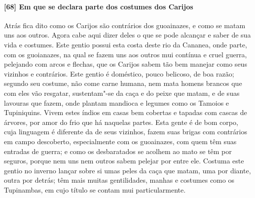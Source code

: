 \paragraph{[68] Em que se declara parte dos costumes dos Carijos} \quad
Atrás fica dito como os Carijos são contrários dos guoainazes, e como se matam uns aos
outros. Agora cabe aqui dizer deles o que se pode alcançar e saber de sua vida e costumes.
Este gentio possui esta costa deste rio da Cananea, onde parte, com os guoianazes, na qual
se fazem uns aos outros mui contínua e cruel guerra, pelejando com arcos e flechas, que os
Carijos sabem tão bem manejar como seus vizinhos e contrários. Este gentio é doméstico,
pouco belicoso, de boa razão; segundo seu costume, não come carne humana, nem mata homens
brancos que com eles vão resgatar, sustentam"-se da caça e do peixe que matam, e de suas
lavouras que fazem, onde plantam mandioca e legumes como os Tamoios e Tupiniquins. Vivem
estes índios em casas bem cobertas e tapadas com cascas de árvores, por amor do frio que
há naquelas partes. Esta gente é de bom corpo, cuja linguagem é diferente da de seus
vizinhos, fazem suas brigas com contrários em campo descoberto, especialmente com os
guoainazes, com quem têm suas entradas de guerra; e como os desbaratados se acolhem ao
mato se têm por seguros, porque nem uns nem outros sabem pelejar por entre ele. Costuma
este gentio no inverno lançar sobre si umas peles da caça que matam, uma por diante, outra
por detrás; têm mais muitas gentilidades, manhas e costumes como os Tupinambas, em cujo
título se contam mui particularmente.

